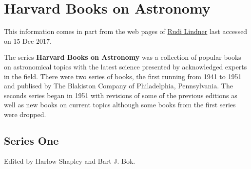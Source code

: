\section{Harvard Books on Astronomy}

This information comes in part from the web pages of
\href{http://www-personal.umich.edu/~rpl/HarvardBooksOnAstronomy.htm}{Rudi
  Lindner} last accessed on 15 Dec 2017.

The series {\bf Harvard Books on Astronomy} was a collection of popular books
on astronomical topics with the latest science presented by acknowledged experts
in the field. There were two series of books, the first running from 1941 to 1951
and publised by The Blakiston Company of Philadelphia, Pennsylvania. The seconds series
began in 1951 with revisions of some of the previous editions as well as new books on
current topics although some books from the first series were dropped.

\subsection{Series One}

Edited by Harlow Shapley and Bart J. Bok.

